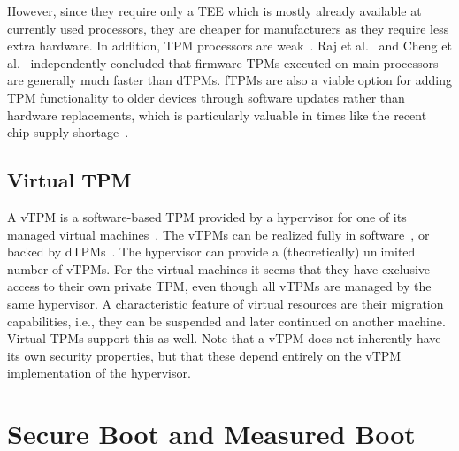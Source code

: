 
However, since they require only a \ac{TEE} which is mostly already available at currently used processors, they are cheaper for manufacturers as they require less extra hardware.
In addition, TPM processors are weak~\cite{Goh2013, Raj2015}.
Raj et al.~\cite{Raj2015} and Cheng et al.~\cite{Cheng2020} independently concluded that firmware TPMs executed on main processors are generally much faster than \acp{dTPM}.
\acp{fTPM} are also a viable option for adding \ac{TPM} functionality to older devices through software updates rather than hardware replacements, which is particularly valuable in times like the recent chip supply shortage~\cite{Voas2021, casper2021}.




\subsection{Virtual TPM}

A vTPM is a software-based TPM provided by a hypervisor for one of its managed virtual machines~\cite{268868}.
The vTPMs can be realized fully in software~\cite{268868}, or backed by dTPMs~\cite{Liu2010}.
The hypervisor can provide a (theoretically) unlimited number of vTPMs.
For the virtual machines it seems that they have exclusive access to their own private TPM, even though all vTPMs are managed by the same hypervisor.
A characteristic feature of virtual resources are their migration capabilities, i.e., they can be suspended and later continued on another machine.
Virtual TPMs support this as well.
Note that a vTPM does not inherently have its own security properties, but that these depend entirely on the vTPM implementation of the hypervisor.


\section{Secure Boot and Measured Boot}

